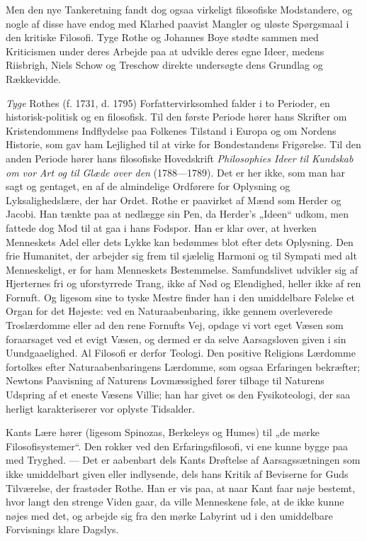 \documentclass[12pt,a4paper,openany]{book}
\newcommand{\opage}[1]{\marginnote{\footnotesize\textit{[#1]}}}
\begin{document}
Men den nye Tankeretning fandt dog ogsaa virkeligt filosofiske Modstandere, og
nogle af disse have endog med Klarhed paavist Mangler og uløste Spørgsmaal i
den kritiske Filosofi. Tyge Rothe og Johannes Boye stødte sammen med
Kriticismen under deres Arbejde paa at udvikle deres egne Ideer, medens
Riisbrigh, Niels Schow og Treschow direkte undersøgte dens Grundlag og Rækkevidde.

\emph{Tyge} Rothes (f. 1731, d. 1795) Forfattervirksomhed falder i to Perioder,
en historisk-politisk og en filosofisk. Til den første Periode hører hans
Skrifter om Kristendommens Indflydelse paa Folkenes Tilstand i Europa og om
Nordens Historie, som gav ham Lejlighed til at virke for Bondestandens
Frigørelse. Til den anden Periode hører hans filosofiske Hovedskrift
\textit{Philosophies Ideer til Kundskab om vor}
\setcounter{footnote}{0}%
\opage{31}\textit{Art og til Glæde over den} (1788---1789). Det er her ikke,
som man har sagt og gentaget, en af de almindelige Ordførere for Oplysning og
Lyksalighedslære, der har Ordet. Rothe er paavirket af Mænd som Herder og
Jacobi. Han tænkte paa at nedlægge sin Pen, da Herder's „Ideen“ udkom, men
fattede dog Mod til at gaa i hans Fodspor. Han er klar over, at hverken
Menneskets Adel eller dets Lykke kan bedømmes blot efter dets Oplysning. Den
frie Humanitet, der arbejder sig frem til sjælelig Harmoni og til Sympati med
alt Menneskeligt, er for ham Menneskets Bestemmelse. Samfundslivet udvikler sig
af Hjerternes fri og uforstyrrede Trang, ikke af Nød og Elendighed, heller ikke
af ren Fornuft. Og ligesom sine to tyske Mestre finder han i den umiddelbare
Følelse et Organ for det Højeste: ved en Naturaabenbaring, ikke gennem
overleverede Troslærdomme eller ad den rene Fornufts Vej, opdage vi vort eget
Væsen som foraarsaget ved et evigt Væsen, og dermed er da selve Aarsagsloven
given i sin Uundgaaelighed. Al Filosofi er derfor Teologi. Den positive
Religions Lærdomme fortolkes efter Naturaabenbaringens Lærdomme, som ogsaa
Erfaringen bekræfter; Newtons Paavisning af Naturens Lovmæssighed fører tilbage
til Naturens Udspring af et eneste Væsens Villie; han har givet os den
Fysikoteologi, der saa herligt karakteriserer vor oplyste Tidsalder.

Kants Lære hører (ligesom Spinozas, Berkeleys og Humes) til „de mørke
Filosofisystemer“. Den rokker ved den Erfaringsfilosofi, vi ene kunne bygge paa
med Tryghed. --- Det er aabenbart dels Kants Drøftelse af Aarsagssætningen som
ikke umiddelbart given eller indlysende, dels hans Kritik af Beviserne for Guds
Tilværelse, der frastøder Rothe. Han er vis paa, at naar Kant faar nøje
bestemt, hvor langt den strenge Viden gaar, da ville Menneskene føle, at de
ikke kunne nøjes med det, og arbejde sig fra den mørke Labyrint ud i den
umiddelbare Forvisnings klare Dagslys.
\end{document}
